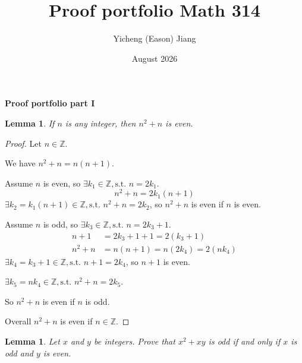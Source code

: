 \documentclass[12pt]{article}
\title{Proof portfolio Math 314}
\author{Yicheng (Eason) Jiang}
\date{August 2026}
\begin{document}
\maketitle


\setlength{\textwidth}{6.5truein}
\setlength{\hoffset}{-.4truein}
\setlength{\textheight}{9.5truein}\setlength\headheight{0in}
\setlength\topmargin{-.75in}
\renewcommand{\(}{\left(}
\renewcommand{\)}{\right)}
\newcommand{\Q}{\mathbb{Q}}
\newcommand{\R}{\mathbb{R}}
\newcommand{\N}{\mathbb{N}}
\newcommand{\Z}{\mathbb{Z}}
\newtheorem{Theorem}{Theorem}
\newtheorem{Conjecture}[equation]{Conjecture}
\newtheorem{Lemma}[equation]{Lemma}
\newtheorem{Proposition}{Proposition}
\newtheorem{Corollary}{Corollary}
\newtheorem*{Definition}{Definition}
\pagestyle{empty}
\begin{center}
{\bf Proof portfolio part I}
\end{center}
\begin{Lemma} If $n$ is any integer, then $n^2+n$ is even.
\end{Lemma}
\begin{proof}
Let $n \in \Z$.

We have $n^2+n=n(n+1)$.

Assume $n$ is even, so $\exists k_1 \in \Z, \text{s.t. } n=2k_1$.
\[
n^2+n=2k_1(n+1)
\]
$\exists k_2 = k_1(n+1) \in \Z, \text{s.t. } n^2+n =2k_2$, so $n^2+n$ is even if $n$ is even.

Assume $n$ is odd, so $\exists k_3 \in \Z, \text{s.t. } n=2k_3+1$.
\begin{align*}
n+1 &= 2k_3+1+1=2(k_3+1) \\
n^2+n &= n(n+1)=n(2k_4)=2(nk_4)
\end{align*}
$\exists k_4=k_3+1 \in \Z, \text{s.t. } n+1=2k_4$, so $n+1$ is even.

$\exists k_5=nk_4\in \Z, \text{s.t. } n^2+n = 2k_5$.

So $n^2+n$ is even if $n$ is odd.

Overall $n^2+n$ is even if $n \in \Z$.
\end{proof}
\vfill
\begin{Lemma} Let $x$ and $y$ be integers. Prove that $x^{2}+x
y$ is odd if and only if $x$ is odd and $y$ is even.
\end{Lemma}
\end{document}
